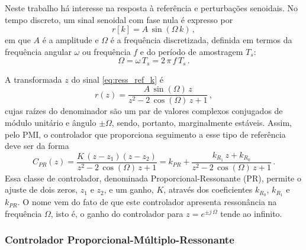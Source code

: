 \documentclass[repeatfields,oneside,overleaf]{tcc}
\newcommand{\mycdot}{ \, }
\newcommand{\myC}[2][]{ C_{#1} \left( #2 \right) }
\begin{document}
Neste trabalho há interesse na resposta à referência e perturbações senoidais.
No tempo discreto, um sinal senoidal com fase nula é expresso por
\begin{equation}\label{eq:ress_ref_k}
    r[k] = A \mycdot \sin \left( \Omega \mycdot k \right)
    \,,
\end{equation}
em que $A$ é a amplitude e $\Omega$ é a frequência discretizada, definida em termos da frequência angular $\omega$ ou frequência $f$ e do período de amostragem $T_s$:
\begin{equation}\label{eq:ress_Omega}
    \Omega = \omega \mycdot T_s = 2 \mycdot \pi \mycdot f \mycdot T_s
    \,.
\end{equation}

A transformada $z$ do sinal \eqref{eq:ress_ref_k} é
\begin{equation}\label{eq:ress_ref_z}
    r(z) = \dfrac{ A \mycdot \sin \left( \Omega \right) \mycdot z }
                 { z^2 - 2 \mycdot \cos \left( \Omega \right) \mycdot z + 1 }
    \,,
\end{equation}
cujas raízes do denominador são um par de valores complexos conjugados de módulo unitário e ângulo $\pm\Omega$, sendo, portanto, marginalmente estáveis.
Assim, pelo PMI, o controlador que proporciona seguimento a esse tipo de referência deve ser da forma
\begin{equation}\label{eq:ress_C_PR}
    \myC[PR]{z}
    = \dfrac{ K \mycdot (z - z_1) (z - z_2) }
            { z^2 - 2 \mycdot \cos \left( \Omega \right) \mycdot z + 1 }
    = k_{PR} + \dfrac{ k_{R_1} \mycdot z + k_{R_0} }
                  { z^2 - 2 \mycdot \cos \left( \Omega \right) \mycdot z + 1 }
    \,.
\end{equation}
Essa classe de controlador, denominada Proporcional-Ressonante (PR), permite o ajuste de dois zeros, $z_1$ e $z_2$, e um ganho, $K$, através dos coeficientes $k_{R_0}$, $k_{R_1}$ e $k_{PR}$.
O nome vem do fato de que este controlador apresenta ressonância na frequência $\Omega$, isto é, o ganho do controlador para $z = e^{\pm j \mycdot \Omega}$ tende ao infinito.

\subsubsection{Controlador Proporcional-Múltiplo-Ressonante}\label{sec:controle_PMR}
\end{document}
